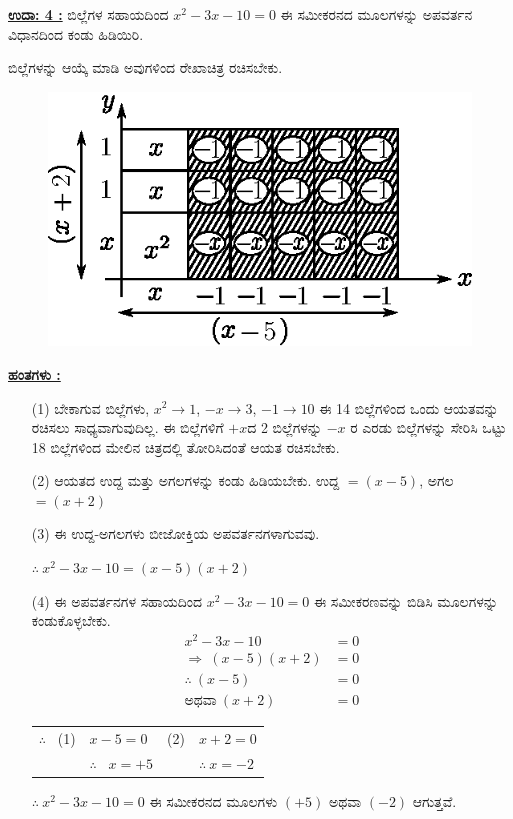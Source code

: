\noindent
{\textbf{\underline{ಉದಾ: 4 :}}} ಬಿಲ್ಲೆಗಳ ಸಹಾಯದಿಂದ $x^2 - 3x - 10 = 0$ ಈ ಸಮೀಕರನದ ಮೂಲ\break ಗಳನ್ನು ಅಪವರ್ತನ ವಿಧಾನದಿಂದ ಕಂಡು ಹಿಡಿಯಿರಿ. 

ಬಿಲ್ಲೆಗಳನ್ನು ಆಯ್ಕೆ ಮಾಡಿ ಅವುಗಳಿಂದ ರೇಖಾಚಿತ್ರ  ರಚಿಸಬೇಕು.
\begin{figure}[H]
\centering
\includegraphics[scale=0.8]{src/figure/chap3/fig3-54b.eps}
\end{figure}
\noindent
{\textbf{\underline{ಹಂತಗಳು :}}}
\begin{itemize}
\item [(1)] ಬೇಕಾಗುವ ಬಿಲ್ಲೆಗಳು, $x^2 \rightarrow 1$, $-x \rightarrow 3$, $-1 \rightarrow 10$ ಈ 14 ಬಿಲ್ಲೆ\break ಗಳಿಂದ ಒಂದು ಆಯತವನ್ನು ರಚಿಸಲು ಸಾಧ್ಯವಾಗುವುದಿಲ್ಲ. ಈ ಬಿಲ್ಲೆಗಳಿಗೆ $+x$ದ 2 ಬಿಲ್ಲೆಗಳನ್ನು  $-x$ ರ ಎರಡು ಬಿಲ್ಲೆಗಳನ್ನು  ಸೇರಿಸಿ ಒಟ್ಟು 18 ಬಿಲ್ಲೆಗಳಿಂದ ಮೇಲಿನ ಚಿತ್ರದಲ್ಲಿ ತೋರಿಸಿದಂತೆ ಆಯತ ರಚಿಸಬೇಕು. 
\item [(2)] ಆಯತದ ಉದ್ದ ಮತ್ತು ಅಗಲಗಳನ್ನು ಕಂಡು ಹಿಡಿಯಬೇಕು. ಉದ್ದ $= (x - 5)$, ಅಗಲ $= (x + 2)$

\eject

\item [(3)] ಈ ಉದ್ದ-ಅಗಲಗಳು ಬೀಜೋಕ್ತಿಯ ಅಪವರ್ತನಗಳಾಗುವವು. 

$\therefore~ x^2 - 3x - 10 = (x-5)(x+2)$
\item [(4)] ಈ ಅಪವರ್ತನಗಳ ಸಹಾಯದಿಂದ $x^2 - 3x - 10 = 0$ ಈ ಸಮೀಕರಣವನ್ನು ಬಿಡಿಸಿ ಮೂಲಗಳನ್ನು ಕಂಡುಕೊಳ್ಳಬೇಕು. 
\begin{align*}
x^2 - 3x - 10 & = 0\\
\Rightarrow~ (x-5)(x+2) & = 0\\
\therefore~ (x-5) & = 0\tag{1}\\
\text{ಅಥವಾ}~ (x+2) & = 0\tag{2}
\end{align*}

\begin{tabular}{llll}
$\therefore$~ (1) & $x - 5 = 0$ & (2) & $x + 2 = 0$\\
& $\therefore$~ $x = +5$ & &$\therefore~ x = -2$
\end{tabular}

$\therefore~ x^2 - 3x - 10 = 0$ ಈ ಸಮೀಕರನದ ಮೂಲಗಳು $(+5)$ ಅಥವಾ $(-2)$ ಆಗುತ್ತವೆ. 
\end{itemize}

